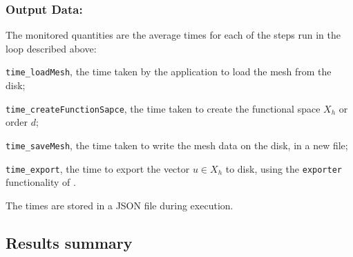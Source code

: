 \subsubsection{Output Data:}

The monitored quantities are the average times for each of the steps run in the loop described above:
\begin{inparaenum}[\it(i)]
\item \texttt{time\_loadMesh}, the time taken by the application to load the mesh from the disk;
\item \texttt{time\_createFunctionSapce}, the time taken to create the functional space $X_h$ or order $d$;
\item \texttt{time\_saveMesh}, the time taken to write the mesh data on the disk, in a new file;
\item \texttt{time\_export}, the time to export the vector $u\in X_h$ to disk, using the \texttt{exporter} functionality of \Feelpp.
\end{inparaenum}
The times are stored in a JSON file during execution.



\subsection{Results summary}


\newcommand{\plot}[2][(0.99,0.99)]{
  \begin{tikzpicture}
    \begin{axis}[
      xlabel={ Number of tasks }, ylabel={ Time [s] },
      xtick=data, xtick align=outside,
      ymode=log,
      ymajorgrids=true, yminorgrids=true,
      xmajorgrids=true,
      xticklabels from table={#2}{resources.tasks},
      cycle list name=color list, legend style={at={#1},anchor=north east}
    ]
      \addplot+[mark=*, color=customdarkblue] table [x expr=\coordindex, y=M2] {#2} ;
      \addlegendentry{ \texttt{M2} }
      \addplot+[mark=*, color=customcyan] table [x expr=\coordindex, y=M3] {#2} ;
      \addlegendentry{ \texttt{M3} }
      \addplot+[mark=*, color=customorange] table [x expr=\coordindex, y=M4] {#2} ;
      \addlegendentry{ \texttt{M4} }
      \addplot+[mark=*, color=custompurple] table [x expr=\coordindex, y=M5] {#2} ;
      \addlegendentry{ \texttt{M5} }
    \end{axis}
  \end{tikzpicture}
  \vspace{-2em}
}

